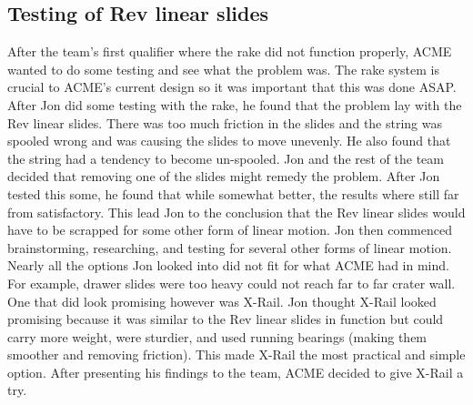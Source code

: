 \documentclass{article}
\begin{document}
\subsection{Testing of Rev linear slides}
After the team's first qualifier where the rake did not function properly, ACME wanted to do some testing and see what the problem was. The rake system is crucial to ACME's current design so it was important that this was done ASAP. After Jon did some testing with the rake, he found that the problem lay with the Rev linear slides. There was too much friction in the slides and the string was spooled wrong and was causing the slides to move unevenly. He also found that the string had a tendency to become un-spooled. Jon and the rest of the team decided that removing one of the slides might remedy the problem. After Jon tested this some, he found that while somewhat better, the results where still far from satisfactory. This lead Jon to the conclusion that the Rev linear slides would have to be scrapped for some other form of linear motion. Jon then commenced brainstorming, researching, and testing for several other forms of linear motion. Nearly all the options Jon looked into did not fit for what ACME had in mind. For example, drawer slides were too heavy could not reach far to far crater wall. One that did look promising however was X-Rail. Jon thought X-Rail looked promising because it was similar to the Rev linear slides in function but could carry more weight, were sturdier, and used running bearings (making them smoother and removing friction). This made X-Rail the most practical and simple option. After presenting his findings to the team, ACME decided to give X-Rail a try. 
\end{document}
